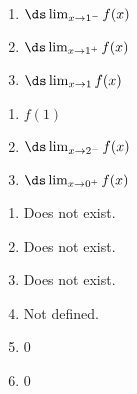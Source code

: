 {
\noindent\begin{minipage}{\linewidth}\centering
{}
\end{minipage}

\noindent\begin{minipage}[t]{.5\linewidth}
\begin{enumerate}
\item		$\ds \lim_{x\to 1^-} f(x)$
\item		$\ds \lim_{x\to 1^+} f(x)$
\item		$\ds \lim_{x\to 1} f(x)$
\end{enumerate}
\end{minipage}
\noindent\begin{minipage}[t]{.5\linewidth}
\begin{enumerate}\addtocounter{enumii}{3}
\item		$f(1)$
\item		$\ds \lim_{x\to 2^-} f(x)$
\item		$\ds \lim_{x\to 0^+} f(x)$
\end{enumerate}
\end{minipage}
}
{\begin{enumerate}
\item		Does not exist.
\item		Does not exist.
\item		Does not exist.
\item		Not defined.
\item		0
\item	 	0
\end{enumerate}
}



